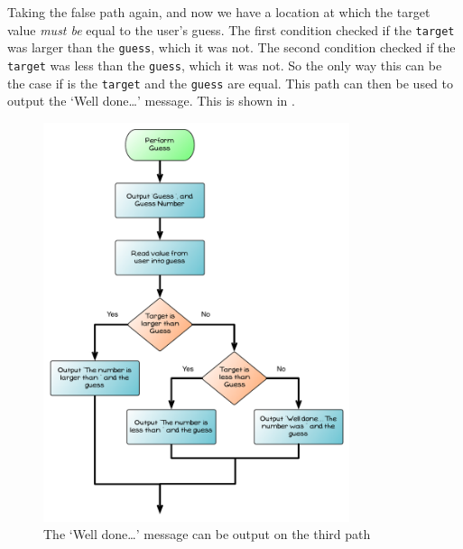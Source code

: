 \clearpage
Taking the false path again, and now we have a location at which the target value \emph{must be} equal to the user's guess. The first condition checked if the \texttt{target} was larger than the \texttt{guess}, which it was not. The second condition checked if the \texttt{target} was less than the \texttt{guess}, which it was not. So the only way this can be the case if is the \texttt{target} and the \texttt{guess} are equal. This path can then be used to output the `Well done\ldots' message. This is shown in . 

\begin{figure}[htbp]
   \centering
   \includegraphics[width=0.8\textwidth]{./topics/control-flow/diagrams/PerformGuess4} 
   \caption{The `Well done\ldots' message can be output on the third path}
   \label{fig:perform-guess-seq-4}
\end{figure}


